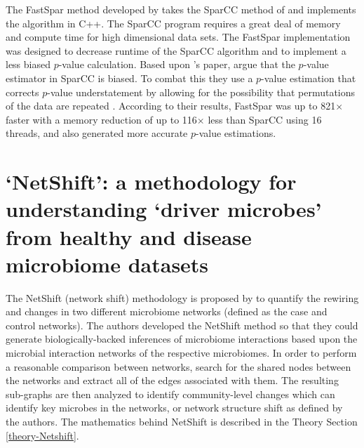 The \acrshort{FastSpar} method developed by \citet{Watts2018} takes the \acrshort{SparCC} method of \citeauthor{Friedman2012} and implements the algorithm in C++. The \acrshort{SparCC} program requires a great deal of memory and compute time for high dimensional data sets. The \acrshort{FastSpar} implementation was designed to decrease runtime of the \acrshort{SparCC} algorithm and to implement a less biased $p$-value calculation. Based upon \citeauthor{Phipson2010}'s paper, \citeauthor{Watts2018} argue that the $p$-value estimator in \acrshort{SparCC} is biased. To combat this they use a $p$-value estimation that corrects $p$-value understatement by allowing for the possibility that permutations of the data are repeated \citep{Watts2018, Phipson2010}. According to their results, \acrshort{FastSpar} was up to 821$\times$ faster with a memory reduction of up to 116$\times$ less than \acrshort{SparCC} using 16 threads, and also generated more accurate $p$-value estimations.

\section{‘NetShift’: a methodology for understanding ‘driver microbes’ from healthy and disease microbiome datasets}\label{lit-netshift}
The NetShift (network shift) methodology is proposed by \citet{Kuntal2018} to quantify the rewiring and changes in two different microbiome networks (defined as the case and control networks). The authors developed the \acrshort{NetShift} method so that they could generate biologically-backed inferences of microbiome interactions based upon the microbial interaction networks of the respective microbiomes. In order to perform a reasonable comparison between networks, \citeauthor{Kuntal2018} search for the shared nodes between the networks and extract all of the edges associated with them. The resulting sub-graphs are then analyzed to identify community-level changes which can identify key microbes in the networks, or network structure shift as defined by the authors. The mathematics behind \acrshort{NetShift} is described in the Theory Section \ref{theory-Netshift}.

